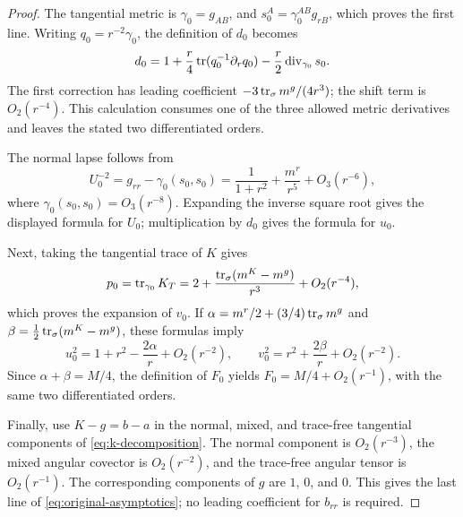 \begin{proof}
The tangential metric is $\gamma_0=g_{AB}$, and
$s_0^A=\gamma_0^{AB}g_{rB}$, which proves the first line. Writing
$q_0=r^{-2}\gamma_0$, the definition of $d_0$ becomes
\[
 d_0=1+\frac r4\operatorname{tr}(q_0^{-1}\partial_rq_0)
                  -\frac r2\operatorname{div}_{\gamma_0}s_0.
\]
The first correction has leading coefficient
$-3\operatorname{tr}_\sigma m^g/(4r^3)$; the shift term is $O_2(r^{-4})$.
This calculation consumes one of the three allowed metric derivatives
and leaves the stated two differentiated orders.

The normal lapse follows from
\[
 U_0^{-2}=g_{rr}-\gamma_0(s_0,s_0)
 =\frac1{1+r^2}+\frac{m^r}{r^5}+O_3(r^{-6}),
\]
where $\gamma_0(s_0,s_0)=O_3(r^{-8})$. Expanding the inverse square root
gives the displayed formula for $U_0$; multiplication by $d_0$ gives
the formula for $u_0$.

Next, taking the tangential trace of $K$ gives
\[
 p_0=\operatorname{tr}_{\gamma_0}K_T
 =2+\frac{\operatorname{tr}_\sigma(m^K-m^g)}{r^3}+O_2(r^{-4}),
\]
which proves the expansion of $v_0$. If
$\alpha=m^r/2+(3/4)\operatorname{tr}_\sigma m^g$ and
$\beta=\tfrac12\operatorname{tr}_\sigma(m^K-m^g)$, these formulas imply
\[
 u_0^2=1+r^2-\frac{2\alpha}{r}+O_2(r^{-2}),\qquad
 v_0^2=r^2+\frac{2\beta}{r}+O_2(r^{-2}).
\]
Since $\alpha+\beta=M/4$, the definition of $F_0$ yields
$F_0=M/4+O_2(r^{-1})$, with the same two differentiated orders.

Finally, use $K-g=b-a$ in the normal, mixed, and trace-free tangential
components of \eqref{eq:k-decomposition}. The normal component is
$O_2(r^{-3})$, the mixed angular covector is $O_2(r^{-2})$, and the
trace-free angular tensor is $O_2(r^{-1})$. The corresponding components
of $g$ are $1$, $0$, and $0$. This gives the last line of
\eqref{eq:original-asymptotics}; no leading coefficient for $b_{rr}$ is
required.
\end{proof}
